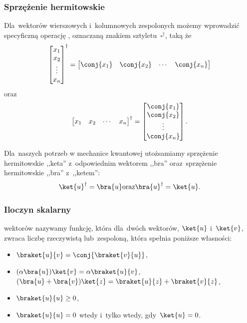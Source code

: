 \subsubsection{Sprzężenie hermitowskie}
Dla~wektorów wierszowych i~kolumnowych zespolonych możemy wprowadzić specyficzną
operację , oznaczaną znakiem sztyletu~$\square^\dagger$, taką że
$$
	\begin{bmatrix}
		x_1    \\
		x_2    \\
		\vdots \\
		x_{n}  \\
	\end{bmatrix}^\dagger
	=
	\begin{bmatrix}
		\conj{x_1} &
		\conj{x_2} &
		\cdots     &
		\conj{x_{n}}
	\end{bmatrix}
$$
oraz
$$
	\begin{bmatrix}
		x_1    &
		x_2    &
		\cdots &
		x_{n}
	\end{bmatrix}^\dagger
	=
	\begin{bmatrix}
		\conj{x_1}   \\
		\conj{x_2}   \\
		\vdots       \\
		\conj{x_{n}} \\
	\end{bmatrix}.
$$

Dla~naszych potrzeb w mechanice kwantowej utożsamiamy sprzężenie hermitowskie
,,keta'' z~odpowiednim wektorem ,,bra'' oraz~sprzężenie hermitowskie ,,bra'' z~,,ketem'':
$$
	\ket{u}^\dagger = \bra{u} \text{oraz} \bra{u}^\dagger = \ket{u}.
$$

\subsubsection{Iloczyn skalarny}
 wektorów nazywamy funkcję,
która dla~dwóch wektorów, $\ket{u}$ i~$\ket{v}$, zwraca liczbę rzeczywistą lub~zespoloną,
która spełnia poniższe własności:

\begin{itemize}
	\item $\braket{u}{v}=\conj{\braket{v}{u}}$,
	\item  $(\alpha\bra{u})\ket{v} = \alpha\braket{u}{v}$,
	      $(\bra{u}+\bra{v})\ket{z}=\braket{u}{z}+\braket{v}{z}$,
	\item $\braket{u}{u}\geq 0$,
	\item $\braket{u}{u} = 0$ wtedy i~tylko wtedy, gdy~$\ket{u}=0$.
\end{itemize}

